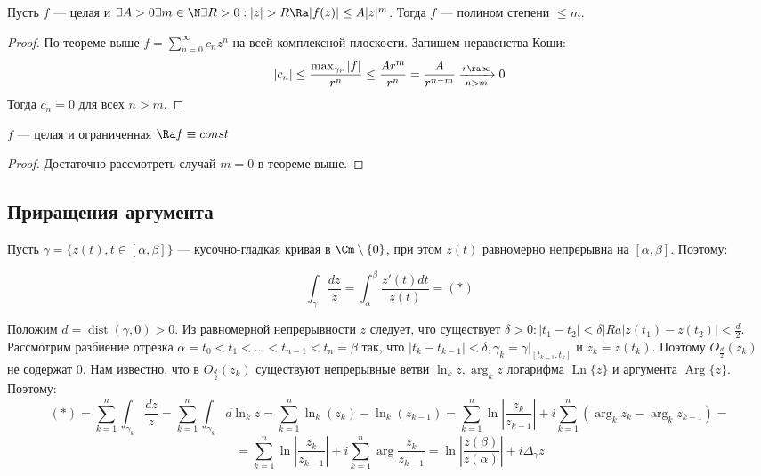 \begin{theorem}
    Пусть \(f\) --- целая и \(\exists A > 0 \exists m \in \N \exists R > 0: |z| > R \Ra |f(z)| \le A|z|^m\). Тогда \(f\) --- полином степени \(\le m\).
\end{theorem}
\begin{proof}
    По теореме выше \(f = \sum_{n = 0}^\infty c_nz^n\) на всей комплексной плоскости. Запишем неравенства Коши:
    \[|c_n| \le \frac{\max_{\gamma_r} |f|}{r^n} \le \frac{Ar^m}{r^n} = \frac{A}{r^{n - m}} \xrightarrow[n > m]{r \ra \infty} 0\]
    Тогда \(c_n = 0\) для всех \(n > m\).
\end{proof}

\begin{corollary}
    \(f\) --- целая и ограниченная \(\Ra f \equiv const\)
\end{corollary}
\begin{proof}
    Достаточно рассмотреть случай \(m = 0\) в теореме выше.
\end{proof}

\subsection{Приращения аргумента}

Пусть \(\gamma = \{z(t), t \in [\alpha, \beta]\}\) --- кусочно-гладкая кривая в \(\Cm \setminus \{0\}\), при этом \(z(t)\) равномерно непрерывна на \([\alpha, \beta]\). Поэтому:

\[\int_\gamma \frac{dz}{z} = \int_\alpha^\beta \frac{z'(t)dt}{z(t)} = (*)\]

Положим \(d = \operatorname{dist}(\gamma, 0) > 0\). Из равномерной непрерывности \(z\) следует, что существует \(\delta > 0: |t_1 - t_2| < \delta |Ra |z(t_1) - z(t_2)| < \frac{d}{2}\). Рассмотрим разбиение отрезка \(\alpha = t_0 < t_1 < \dots < t_{n - 1} < t_n = \beta\) так, что \(|t_{k} - t_{k - 1}| < \delta, \gamma_k = \gamma|_{[t_{k - 1}, t_{k}]}\) и \(z_k = z(t_k)\). Поэтому \(O_\frac{d}{2}(z_k)\) не содержат \(0\). Нам известно, что в \(O_\frac{d}{2}(z_k)\) существуют непрерывные ветви \(\ln_k z, \arg_k z\) логарифма \(\operatorname{Ln} \{z\}\) и аргумента \(\operatorname{Arg}\{z\}\). Поэтому:
\[(*) = \sum_{k = 1}^n \int_{\gamma_k}\frac{dz}{z} = \sum_{k = 1}^n \int_{\gamma_k} d\ln_kz = \sum_{k = 1}^n \ln_k(z_k) - \ln_k(z_{k - 1}) = \sum_{k = 1}^n \ln \left| \frac{z_k}{z_{k - 1}} \right| + i\sum_{k = 1}^n(\arg_k z_k - \arg_kz_{k - 1}) =\]
\[= \sum_{k = 1}^n \ln \left| \frac{z_k}{z_{k - 1}} \right| + i\sum_{k = 1}^n \arg \frac{z_k}{z_{k - 1}} = \ln \left|\frac{z(\beta)}{z(\alpha)}\right| + i\Delta_\gamma z\]

